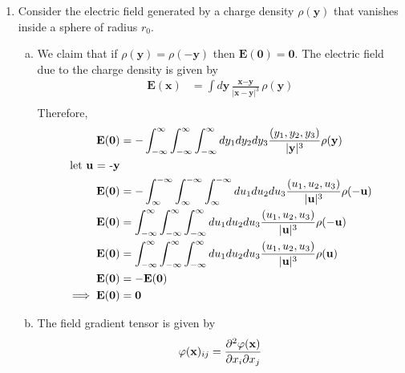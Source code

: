 \documentclass[]{book}
\begin{document}
\begin{enumerate}[1)]
\begin{enumerate}[(i)]
\end{enumerate}
\noindent\rule{15cm}{0.4pt} \\
\item Consider the electric field generated by a charge density $\rho(\textbf{y})$ that vanishes inside a sphere of radius $r_0$. \\
\begin{enumerate}[a)]
\item We claim that if $\rho(\textbf{y}) = \rho( - \textbf{y}) $ then $\textbf{E}(\textbf{0}) = \textbf{0}$. The electric field due to the charge density is given by
\begin{equation}
\begin{split}
\textbf{E}(\textbf{x}) &= \int d\textbf{y} \frac{\textbf{x} -\textbf{y}}{| \textbf{x} - \textbf{y}|^3}\rho(\textbf{y})\\
\end{split}
\end{equation}
Therefore, 
\begin{equation}
\begin{split}
\textbf{E}(\textbf{0}) &= -\int_{-\infty}^{\infty}\int_{-\infty}^{\infty}\int_{-\infty}^{\infty} d y_1 d y_2 d y_3 \frac{(y_1,y_2,y_3)}{| \textbf{y}|^3}\rho(\textbf{y}) \\
\text{let \textbf{u} = -\textbf{y}} \\
\textbf{E}(\textbf{0}) &= - \int_{\infty}^{-\infty}\int_{\infty}^{-\infty}\int_{\infty}^{-\infty} d u_1 d u_2 d u_3 \frac{(u_1,u_2,u_3)}{| \textbf{u}|^3}\rho(-\textbf{u}) \\
\textbf{E}(\textbf{0}) &=  \int_{-\infty}^{\infty}\int_{-\infty}^{\infty}\int_{-\infty}^{\infty} d u_1 d u_2 d u_3 \frac{(u_1,u_2,u_3)}{| \textbf{u}|^3}\rho(-\textbf{u}) \\
\textbf{E}(\textbf{0}) &=  \int_{-\infty}^{\infty}\int_{-\infty}^{\infty}\int_{-\infty}^{\infty} d u_1 d u_2 d u_3 \frac{(u_1,u_2,u_3)}{| \textbf{u}|^3}\rho(\textbf{u}) \\
\textbf{E}(\textbf{0}) &= -\textbf{E}(\textbf{0}) \\
\implies \textbf{E}(\textbf{0}) &= \textbf{0} \\ 
\end{split}
\end{equation}
\item
The field gradient tensor is given by
\begin{equation}
\begin{split}
\varphi(\textbf{x})_{ij} & = \pdv{\varphi(\textbf{x})}{x_i}{x_j} \\ 

\end{split}
\end{equation}
\end{enumerate}
\end{enumerate}
\end{document}
